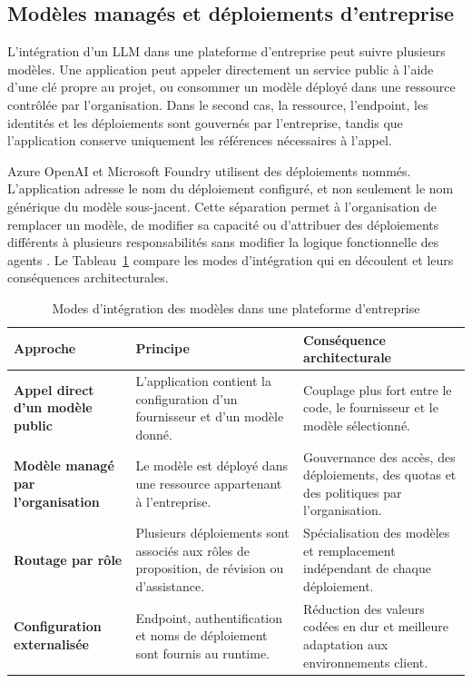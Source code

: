 \subsection{Modèles managés et déploiements d'entreprise}

L'intégration d'un LLM dans une plateforme d'entreprise peut suivre plusieurs modèles. Une application peut appeler directement un service public à l'aide d'une clé propre au projet, ou consommer un modèle déployé dans une ressource contrôlée par l'organisation. Dans le second cas, la ressource, l'endpoint, les identités et les déploiements sont gouvernés par l'entreprise, tandis que l'application conserve uniquement les références nécessaires à l'appel.

Azure OpenAI et Microsoft Foundry utilisent des déploiements nommés. L'application adresse le nom du déploiement configuré, et non seulement le nom générique du modèle sous-jacent. Cette séparation permet à l'organisation de remplacer un modèle, de modifier sa capacité ou d'attribuer des déploiements différents à plusieurs responsabilités sans modifier la logique fonctionnelle des agents \cite{azure-foundry-endpoints}. Le Tableau~\ref{tab:modeles-manages-entreprise-ch2} compare les modes d'intégration qui en découlent et leurs conséquences architecturales.

\begin{table}[H]
    \centering
    \caption{Modes d'intégration des modèles dans une plateforme d'entreprise}
    \label{tab:modeles-manages-entreprise-ch2}
    \small
    \begin{tabularx}{\textwidth}{|>{\bfseries\RaggedRight\arraybackslash}p{3.8cm}|>{\RaggedRight\arraybackslash}p{5cm}|>{\RaggedRight\arraybackslash}X|}
        \hline
        \rowcolor{cgilight!95}
        \textbf{Approche} & \textbf{Principe} & \textbf{Conséquence architecturale} \\
        \hline
        Appel direct d'un modèle public & L'application contient la configuration d'un fournisseur et d'un modèle donné. & Couplage plus fort entre le code, le fournisseur et le modèle sélectionné. \\
        \hline
        Modèle managé par l'organisation & Le modèle est déployé dans une ressource appartenant à l'entreprise. & Gouvernance des accès, des déploiements, des quotas et des politiques par l'organisation. \\
        \hline
        Routage par rôle & Plusieurs déploiements sont associés aux rôles de proposition, de révision ou d'assistance. & Spécialisation des modèles et remplacement indépendant de chaque déploiement. \\
        \hline
        Configuration externalisée & Endpoint, authentification et noms de déploiement sont fournis au runtime. & Réduction des valeurs codées en dur et meilleure adaptation aux environnements client. \\
        \hline
    \end{tabularx}
\end{table}

